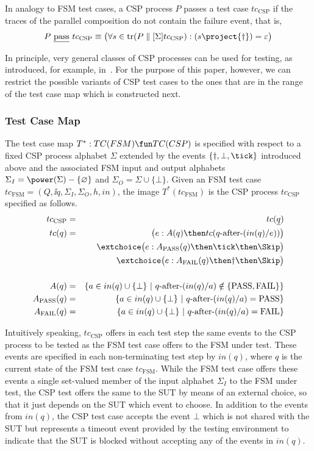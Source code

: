  In analogy to FSM test cases, a CSP process $P$ passes a test case $tc_\text{CSP}$
 if the traces of the parallel composition do not contain the failure event, that is,
 $$
 P\ \pass\ tc_\text{CSP} \equiv \big(
 \forall s\in\trc(P\parallel[\Sigma] tc_\text{CSP}): (s\project \{\dag\}) = \varepsilon
 \big)
 $$

 
 In principle, very general classes of CSP processes can be
 used for testing, as introduced, for example, 
 in~\cite{DBLP:conf/fm/PeleskaS96,peleska1997a}. For the purpose of this paper, however, we can restrict the possible variants of CSP test cases to the ones that are in the range of the test case map which is constructed next.


\subsubsection*{Test Case Map}

The test case map $T^* :TC(FSM) \fun TC(CSP)$ is specified with respect to a fixed
CSP process alphabet $\Sigma$ extended by the events $\{\dag,\bot,\tick \}$ introduced
above
and the associated FSM input and output alphabets
$\Sigma_I = \power(\Sigma)-\{\varnothing\}$ and $\Sigma_O=\Sigma\cup \{\bot \}$.
Given an FSM test case $tc_\text{FSM}=(Q,\ii q,\Sigma_I,\Sigma_O,h,in)$, 
the image $T^*(tc_\text{FSM})$ is the CSP process $tc_\text{CSP}$ specified 
as follows.
\begin{eqnarray*}
tc_\text{CSP} & = & tc(\ii q)
\\
tc(q) & = & \big( e :  A(q) \then  tc(q\after (in(q)/e)) \big)
\\ & & \extchoice
 \big( e : A_\text{PASS}(q)   \then \tick \then \Skip \big)
\\ & & \extchoice
 \big( e : A_\text{FAIL}(q) \then \dag \then \Skip \big)
\\ & & 
\\
A(q) & = & \{ a\in in(q)\cup\{\bot\}~|~q\after (in(q)/a)\notin \{\text{PASS},\text{FAIL}\} \}
\\
A_\text{PASS}(q) & = & \{ a\in in(q)\cup\{\bot\}~|~q\after(in(q)/a) = \text{PASS} \}
\\
A_\text{FAIL}(q) & = & \{ a\in in(q)\cup\{\bot\}~|~q\after(in(q)/a) = \text{FAIL} \}
\end{eqnarray*}

Intuitively speaking, $tc_\text{CSP}$ offers in each test step the same events to 
the CSP process to be tested as the FSM test case offers to the FSM under test. 
These events are specified in each non-terminating test step by $in(q)$, where
$q$ is the current state of the FSM test case $tc_\text{FSM}$. While the FSM test 
case offers these events a single set-valued member of the input alphabet $\Sigma_I$
to the FSM under test, the CSP test offers the same to the SUT by means of an external choice, so that it just depends on the SUT which event to choose. In addition to the
events from $in(q)$, the CSP test case 
accepts the event $\bot$ which is not shared with
the SUT but represents a timeout event provided by the testing environment to indicate
that the SUT is blocked without accepting any of the events in $in(q)$.

